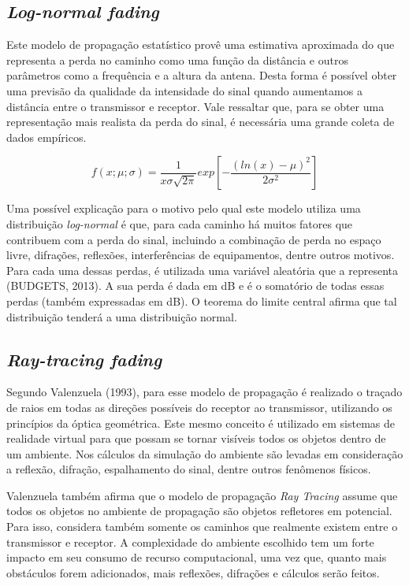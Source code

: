 \documentclass[
	12pt,				%
	openright,			%
	twoside,			%
	a4paper,			%
	english,			%
	french,				%
	spanish,			%
	brazil				%
	]{abntex2}
\begin{document}
\subsection[Log-normal fading]{\textit{Log-normal fading}}

Este modelo de propagação estatístico provê uma estimativa aproximada do que representa a perda no caminho como uma função da distância e outros parâmetros como a frequência e a altura da antena. Desta forma é possível obter uma previsão da qualidade da intensidade do sinal quando aumentamos a distância entre o transmissor e receptor. Vale ressaltar que, para se obter uma representação mais realista da perda do sinal, é necessária uma grande coleta de dados empíricos.


\begin{equation}
f(x; \mu; \sigma) = \frac{1}{x \sigma \sqrt{2 \pi}} exp[-\frac{(ln(x) - \mu)^{2}}{2 \sigma^{2}}]
\end{equation}

Uma possível explicação para o motivo pelo qual este modelo utiliza uma distribuição \textit{log-normal} é que, para cada caminho há muitos fatores que contribuem com a perda do sinal, incluindo a combinação de perda no espaço livre, difrações, reflexões, interferências de equipamentos, dentre outros motivos. Para cada uma dessas perdas, é utilizada uma variável aleatória que a representa (BUDGETS, 2013). A sua perda é dada em dB e é o somatório de todas essas perdas (também expressadas em dB). O teorema do limite central afirma que tal distribuição tenderá a uma distribuição normal.

\subsection[Ray-tracing fading]{\textit{Ray-tracing fading}}

Segundo Valenzuela (1993), para esse modelo de propagação é realizado o traçado de raios em todas as direções possíveis do receptor ao transmissor, utilizando os princípios da óptica geométrica. Este mesmo conceito é utilizado em sistemas de realidade virtual para que possam se tornar visíveis todos os objetos dentro de um ambiente. Nos cálculos da simulação do ambiente são levadas em consideração a reflexão, difração, espalhamento do sinal, dentre outros fenômenos físicos.
 
Valenzuela também afirma que o modelo de propagação \textit{Ray Tracing} assume que todos os objetos no ambiente de propagação são objetos refletores em potencial. Para isso, considera também somente os caminhos que realmente existem entre o transmissor e receptor. A complexidade do ambiente escolhido tem um forte impacto em seu consumo de recurso computacional, uma vez que, quanto mais obstáculos forem adicionados, mais reflexões, difrações e cálculos serão feitos.
\end{document}
